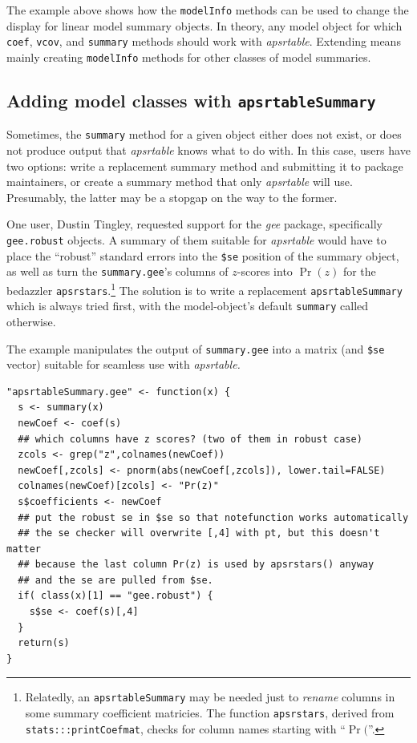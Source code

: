 \documentclass[10pt]{article} %
\begin{document}
The example above shows how the \verb|modelInfo| methods can be used to change the display for linear model summary objects. In theory, any model object for which \verb|coef|, \verb|vcov|, and \verb|summary| methods should work with \textit{apsrtable}. Extending means mainly creating \verb|modelInfo| methods for other classes of model summaries. 

\subsection{Adding model classes with \texttt{apsrtableSummary}}
\label{sec:extend-other-models}

Sometimes, the \texttt{summary} method for a given object either does not exist, or does not produce output that \emph{apsrtable} knows what to do with. In this case, users have two options: write a replacement summary method and submitting it to package maintainers, or create a summary method that only \textit{apsrtable} will use. Presumably, the latter may be a stopgap on the way to the former.

One user, Dustin Tingley, requested support for the \textit{gee} package, specifically \texttt{gee.robust} objects. A summary of them suitable for \textit{apsrtable} would have to place the “robust” standard errors into the \texttt{\$se} position of the summary object, as well as turn the \texttt{summary.gee}'s columns of $z$-scores into $\Pr(z)$ for the bedazzler \texttt{apsrstars}.\footnote{Relatedly, an \texttt{apsrtableSummary} may be needed just to \emph{rename} columns in some summary coefficient matricies. The function \texttt{apsrstars}, derived from \texttt{stats:::printCoefmat}, checks for column names starting with “$\Pr($”.} The solution is to write a replacement \texttt{apsrtableSummary} which is always tried first, with the model-object's default \texttt{summary} called otherwise.

The example manipulates the output of \texttt{summary.gee} into a matrix (and \texttt{\$se} vector) suitable for seamless use with \textit{apsrtable.}
\begin{verbatim}
"apsrtableSummary.gee" <- function(x) {
  s <- summary(x)
  newCoef <- coef(s)
  ## which columns have z scores? (two of them in robust case)
  zcols <- grep("z",colnames(newCoef))
  newCoef[,zcols] <- pnorm(abs(newCoef[,zcols]), lower.tail=FALSE)
  colnames(newCoef)[zcols] <- "Pr(z)"
  s$coefficients <- newCoef
  ## put the robust se in $se so that notefunction works automatically
  ## the se checker will overwrite [,4] with pt, but this doesn't matter
  ## because the last column Pr(z) is used by apsrstars() anyway
  ## and the se are pulled from $se.
  if( class(x)[1] == "gee.robust") {
    s$se <- coef(s)[,4]
  }
  return(s)
}
\end{verbatim}
\end{document}
